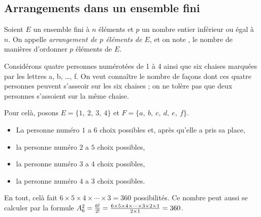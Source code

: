             \subsection{Arrangements dans un ensemble fini}
                  \begin{defi}
                        Soient $E$ un ensemble fini \`a $n$ \'el\'ements et $p$ un nombre entier inf\'erieur ou \'egal \`a $n$.
                        On appelle \emph{arrangement de $p$ \'el\'ements de $E$}, et on note 
                        , le nombre de mani\`eres d'ordonner $p$ \'el\'ements de $E$.
                  \end{defi}
                  	\begin{prop}
                  			\propbox{
                 				\[
                  					\Arr{n}{p} = \frac{n!}{(n-p)!}
                  				\]}
                  	\end{prop}
						\begin{ex}
							Consid\'erons quatre personnes num\'erot\'ees de 1 \`a 4
							ainsi que six chaises marqu\'ees par les lettres a, b, \ldots, f.
							On veut conna\^itre le nombre de fa\c{c}ons dont ces quatre personnes
							peuvent s'asseoir sur les six chaises ;
							on ne tol\`ere pas que deux personnes s'assoient sur la m\^eme chaise.
							\begin{valiny}
								Pour cel\`a, posons	$E = \{ 1 ,\ 2,\ 3,\ 4 \}$ et 
															$F = \{ a,\ b,\ c,\ d,\ e,\ f \}$.
								\begin{itemize}
									\item La personne num\'ero $1$ a $6$ choix possibles et, apr\`es qu'elle a pris sa place,
									\item la personne num\'ero $2$ a $5$ choix possibles,
									\item la personne num\'ero $3$ a $4$ choix possibles,
									\item la personne num\'ero $4$ a $3$ choix possibles.
								\end{itemize}
								En tout, cel\`a fait $6\times 5 \times 4 \times \cdots \times 3 = 360$ possibilit\'es.
									Ce nombre peut aussi se calculer par la formule
								$A_{6}^{2} 
									= \frac{6!}{2!} 
									= \frac{6\times 5 \times 4 \times \cdots \times 3 \times 2 \times 1}{2 \times 1}
									= 360
								$.
							\end{valiny}
						\end{ex}
